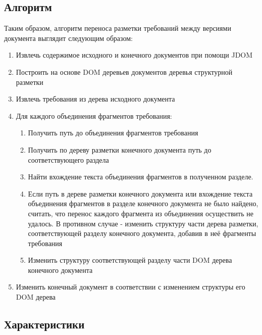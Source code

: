 \subsection{Алгоритм}

Таким образом, алгоритм переноса разметки требований между версиями документа выглядит следующим образом:

\begin{enumerate}
\item Извлечь содержимое исходного и конечного документов при помощи JDOM

\item Построить на основе DOM деревьев документов деревья структурной разметки

\item Извлечь требования из дерева исходного документа

\item Для каждого объединения фрагментов требования:

\begin{enumerate}

\item Получить путь до объединения фрагментов требования

\item Получить по дереву разметки конечного документа путь до соответствующего раздела

\item Найти вхождение текста объединения фрагментов в полученном разделе.

\item Если путь в дереве разметки конечного документа или вхождение текста объединения фрагментов в разделе конечного документа не было найдено, считать, что перенос каждого фрагмента из объединения осуществить не удалось. В противном случае - изменить структуру части дерева разметки, соответствующей разделу конечного документа, добавив в неё фрагменты требования

\item Изменить структуру соответствующей разделу части DOM дерева конечного документа

\end{enumerate}

\item Изменить конечный документ в соответствии с изменением структуры его DOM дерева

\end{enumerate}

\subsection{Характеристики}

